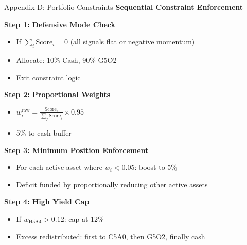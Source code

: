 \documentclass[aspectratio=169,10pt]{beamer}
\begin{document}
\begin{frame}{Appendix D: Portfolio Constraints}
\textbf{Sequential Constraint Enforcement}

\vspace{0.3cm}

\textbf{Step 1: Defensive Mode Check}
\begin{itemize}
    \item If $\sum_i \text{Score}_i = 0$ (all signals flat or negative momentum)
    \item Allocate: 10\% Cash, 90\% G5O2
    \item Exit constraint logic
\end{itemize}

\vspace{0.2cm}

\textbf{Step 2: Proportional Weights}
\begin{itemize}
    \item $w_i^{\text{raw}} = \frac{\text{Score}_i}{\sum_j \text{Score}_j} \times 0.95$
    \item 5\% to cash buffer
\end{itemize}

\vspace{0.2cm}

\textbf{Step 3: Minimum Position Enforcement}
\begin{itemize}
    \item For each active asset where $w_i < 0.05$: boost to 5\%
    \item Deficit funded by proportionally reducing other active assets
\end{itemize}

\vspace{0.2cm}

\textbf{Step 4: High Yield Cap}
\begin{itemize}
    \item If $w_{\text{H5A4}} > 0.12$: cap at 12\%
    \item Excess redistributed: first to C5A0, then G5O2, finally cash
\end{itemize}
\end{frame}
\end{document}
